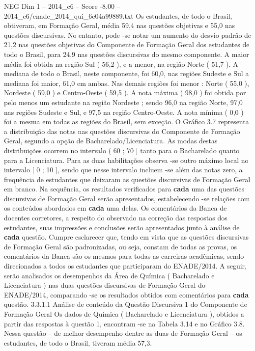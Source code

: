 \begin{textsample}{NEG Dim 1 – 2014\_c6 – Score -8.00 – 2014\_c6/enade\_2014\_qui\_6c04a99889.txt}
Os estudantes, de todo o Brasil, obtiveram, em Formação Geral, média 59,4 nas questões objetivas e 55,0 nas questões discursivas.
No entanto, pode -se notar um aumento do desvio padrão de 21,2 nas questões objetivas do Componente de Formação Geral dos estudantes de todo o Brasil, para 24,9 nas questões discursivas do mesmo componente.
A maior média foi obtida na região Sul ( 56,2 ), e a menor, na região Norte ( 51,7 ).
A mediana de todo o Brasil, neste componente, foi 60,0, nas regiões Sudeste e Sul a mediana foi maior, 61,0 em ambas.
Nas demais regiões foi menor : Norte ( 55,0 ), Nordeste ( 59,0 ) e Centro-Oeste ( 59,5 ).
A nota máxima ( 98,0 ) foi obtida por pelo menos um estudante na região Nordeste ; sendo 96,0 na região Norte, 97,0 nas regiões Sudeste e Sul, e 97,5 na região Centro-Oeste.
A nota mínima ( 0,0 ) foi a mesma em todas as regiões do Brasil, sem exceção.
O Gráfico 3.7 representa a distribuição das notas nas questões discursivas do Componente de Formação Geral, segundo a opção de Bacharelado/Licenciatura.
As modas destas distribuições ocorrem no intervalo ( 60 ; 70 ] tanto para o Bacharelado quanto para a Licenciatura.
Para as duas habilitações observa -se outro máximo local no intervalo [ 0 ; 10 ], sendo que nesse intervalo incluem -se além das notas zero, a frequência de estudantes que deixaram as questões discursivas de Formação Geral em branco.
Na sequência, os resultados verificados para \textbf{cada} uma das questões discursivas de Formação Geral serão apresentados, estabelecendo -se relações com os conteúdos abordados em \textbf{cada} uma delas.
Os comentários da Banca de docentes corretores, a respeito do observado na correção das respostas dos estudantes, suas impressões e conclusões serão apresentados junto à análise de \textbf{cada} questão.
Cumpre esclarecer que, tendo em vista que as questões discursivas de Formação Geral são padronizadas, ou seja, constam de todas as provas, os comentários da Banca são os mesmos para todas as carreiras acadêmicas, sendo direcionados a todos os estudantes que participaram do ENADE/2014.
A seguir, serão analisados os desempenhos da Área de Química ( Bacharelado e Licenciatura ) nas duas questões discursivas de Formação Geral do ENADE/2014, comparando -se os resultados obtidos com comentários para \textbf{cada} questão. 3.3.1.1 Análise de conteúdo da Questão Discursiva 1 do Componente de Formação Geral Os dados de Química ( Bacharelado e Licenciatura ), obtidos a partir das respostas à questão 1, encontram -se na Tabela 3.14 e no Gráfico 3.8.
Nessa questão – de melhor desempenho dentre as duas de Formação Geral – os estudantes, de todo o Brasil, tiveram média 57,3.

\end{textsample}
